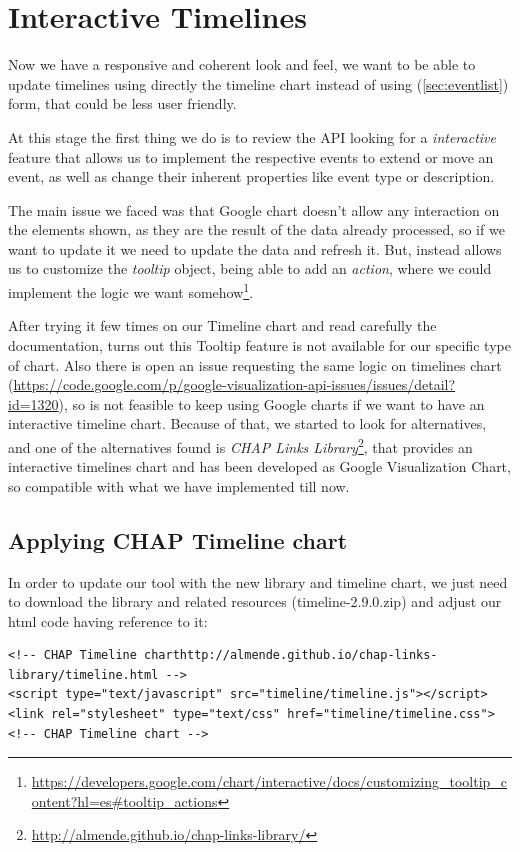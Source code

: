 \chapter{Interactive Timelines}
Now we have a responsive and coherent look and feel, we want to be able to
update timelines using directly the timeline chart instead of using 
(\ref{sec:eventlist}) form, that could be less user friendly.

At this stage the first thing we do is to review the API looking for a
\emph{interactive} feature that allows us to implement the respective events to
extend or move an event, as well as change their inherent properties like event
type or description.

The main issue we faced was that Google chart doesn't allow any interaction on
the elements shown, as they are the result of the data already processed, so if we
want to update it we need to update the data and refresh it. But, instead allows
us to customize the \emph{tooltip} object, being able to add an \emph{action},
where we could implement the logic we want
somehow\footnote{\url{https://developers.google.com/chart/interactive/docs/customizing_tooltip_content?hl=es#tooltip_actions}}.

After trying it few times on our Timeline chart and read carefully the
documentation, turns out this Tooltip feature is not available for our specific
type of chart. Also there is open an issue requesting the same logic on
timelines chart
(\url{https://code.google.com/p/google-visualization-api-issues/issues/detail?id=1320}),
so is not feasible to keep using Google charts if we want to have an interactive
timeline chart. Because of that, we started to look for alternatives, and one of
the alternatives found is \emph{CHAP Links
Library}\footnote{\url{http://almende.github.io/chap-links-library/}}, that
provides an interactive timelines chart and has been developed as Google
Visualization Chart, so compatible with what we have implemented till now.

\section{Applying CHAP Timeline chart}
In order to update our tool with the new library and timeline chart, we just
need to download the library and related resources (timeline-2.9.0.zip) and
adjust our html code having reference to it:

\begin{lstlisting}[style=html,breaklines=true,caption=CHAP\ Link\
library,label=f_interactivetimelines_code]
<!-- CHAP Timeline charthttp://almende.github.io/chap-links-library/timeline.html -->
<script type="text/javascript" src="timeline/timeline.js"></script> 
<link rel="stylesheet" type="text/css" href="timeline/timeline.css">
<!-- CHAP Timeline chart -->
\end{lstlisting} 

